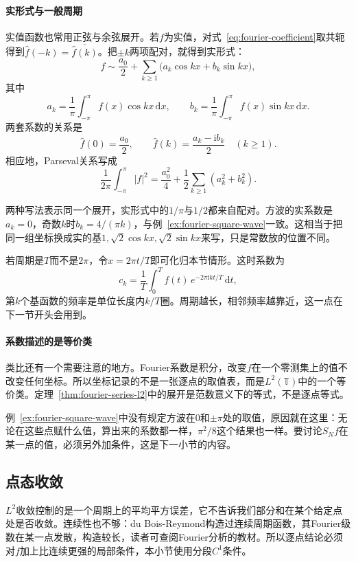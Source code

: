 \paragraph{实形式与一般周期}

实值函数也常用正弦与余弦展开。若$f$为实值，对式~\eqref{eq:fourier-coefficient}取共轭得到$\widehat f(-k)=\overline{\widehat f(k)}$。把$\pm k$两项配对，就得到实形式：
\[
f\sim\frac{a_0}2+\sum_{k\geq1}\bigl(a_k\cos kx+b_k\sin kx\bigr),
\]
其中
\[
a_k=\frac1\pi\int_{-\pi}^{\pi}f(x)\cos kx\,\mathrm dx,\qquad
b_k=\frac1\pi\int_{-\pi}^{\pi}f(x)\sin kx\,\mathrm dx.
\]
两套系数的关系是
\[
\widehat f(0)=\frac{a_0}2,\qquad\widehat f(k)=\frac{a_k-\mathrm ib_k}2\quad(k\geq1).
\]
相应地，Parseval关系写成
\[
\frac1{2\pi}\int_{-\pi}^{\pi}\lvert f\rvert^2=\frac{a_0^2}4+\frac12\sum_{k\geq1}(a_k^2+b_k^2).
\]

两种写法表示同一个展开，实形式中的$1/\pi$与$1/2$都来自配对。方波的实系数是$a_k=0$，奇数$k$时$b_k=4/(\pi k)$，与例~\ref{ex:fourier-square-wave}一致。这相当于把同一组坐标换成实的基$1,\sqrt2\cos kx,\sqrt2\sin kx$来写，只是常数放的位置不同。

若周期是$T$而不是$2\pi$，令$x=2\pi t/T$即可化归本节情形。这时系数为
\begin{equation}
c_k=\frac1T\int_0^Tf(t)\,e^{-2\pi\mathrm ikt/T}\,\mathrm dt ,
\label{eq:fourier-period-T}
\end{equation}
第$k$个基函数的频率是单位长度内$k/T$圈。周期越长，相邻频率越靠近，这一点在下一节开头会用到。

\paragraph{系数描述的是等价类}

类比还有一个需要注意的地方。Fourier系数是积分，改变$f$在一个零测集上的值不改变任何坐标。所以坐标记录的不是一张逐点的取值表，而是$L^2(\mathbb T)$中的一个等价类。定理~\ref{thm:fourier-series-l2}中的展开是范数意义下的等式，不是逐点等式。

例~\ref{ex:fourier-square-wave}中没有规定方波在$0$和$\pm\pi$处的取值，原因就在这里：无论在这些点赋什么值，算出来的系数都一样，$\pi^2/8$这个结果也一样。要讨论$S_Nf$在某一点的值，必须另外加条件，这是下一小节的内容。

\subsection{点态收敛}
\label{sec:fourier-series-pointwise}

$L^2$收敛控制的是一个周期上的平均平方误差，它不告诉我们部分和在某个给定点处是否收敛。连续性也不够：du Bois-Reymond构造过连续周期函数，其Fourier级数在某一点发散，构造较长，读者可查阅Fourier分析的教材。所以逐点结论必须对$f$加上比连续更强的局部条件，本小节使用分段$C^1$条件。

